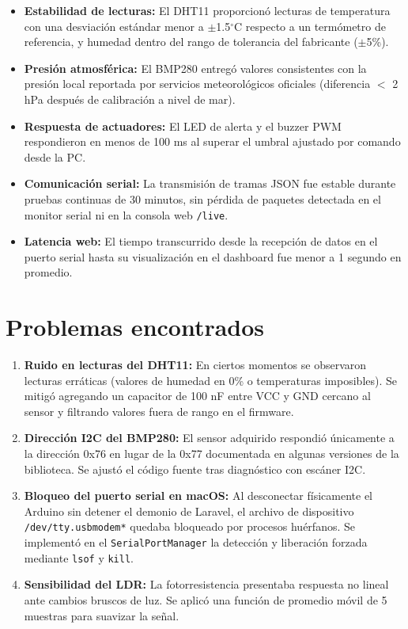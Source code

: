 \begin{itemize}[leftmargin=*]
    \item \textbf{Estabilidad de lecturas:} El DHT11 proporcionó lecturas de temperatura con una desviación estándar menor a $\pm$1.5$^\circ$C respecto a un termómetro de referencia, y humedad dentro del rango de tolerancia del fabricante ($\pm$5\%).
    \item \textbf{Presión atmosférica:} El BMP280 entregó valores consistentes con la presión local reportada por servicios meteorológicos oficiales (diferencia $<$ 2 hPa después de calibración a nivel de mar).
    \item \textbf{Respuesta de actuadores:} El LED de alerta y el buzzer PWM respondieron en menos de 100 ms al superar el umbral ajustado por comando desde la PC.
    \item \textbf{Comunicación serial:} La transmisión de tramas JSON fue estable durante pruebas continuas de 30 minutos, sin pérdida de paquetes detectada en el monitor serial ni en la consola web \texttt{/live}.
    \item \textbf{Latencia web:} El tiempo transcurrido desde la recepción de datos en el puerto serial hasta su visualización en el dashboard fue menor a 1 segundo en promedio.
\end{itemize}

\section{Problemas encontrados}

\begin{enumerate}[leftmargin=*]
    \item \textbf{Ruido en lecturas del DHT11:} En ciertos momentos se observaron lecturas erráticas (valores de humedad en 0\% o temperaturas imposibles). Se mitigó agregando un capacitor de 100 nF entre VCC y GND cercano al sensor y filtrando valores fuera de rango en el firmware.
    \item \textbf{Dirección I2C del BMP280:} El sensor adquirido respondió únicamente a la dirección 0x76 en lugar de la 0x77 documentada en algunas versiones de la biblioteca. Se ajustó el código fuente tras diagnóstico con escáner I2C.
    \item \textbf{Bloqueo del puerto serial en macOS:} Al desconectar físicamente el Arduino sin detener el demonio de Laravel, el archivo de dispositivo \texttt{/dev/tty.usbmodem*} quedaba bloqueado por procesos huérfanos. Se implementó en el \texttt{SerialPortManager} la detección y liberación forzada mediante \texttt{lsof} y \texttt{kill}.
    \item \textbf{Sensibilidad del LDR:} La fotorresistencia presentaba respuesta no lineal ante cambios bruscos de luz. Se aplicó una función de promedio móvil de 5 muestras para suavizar la señal.
\end{enumerate}

